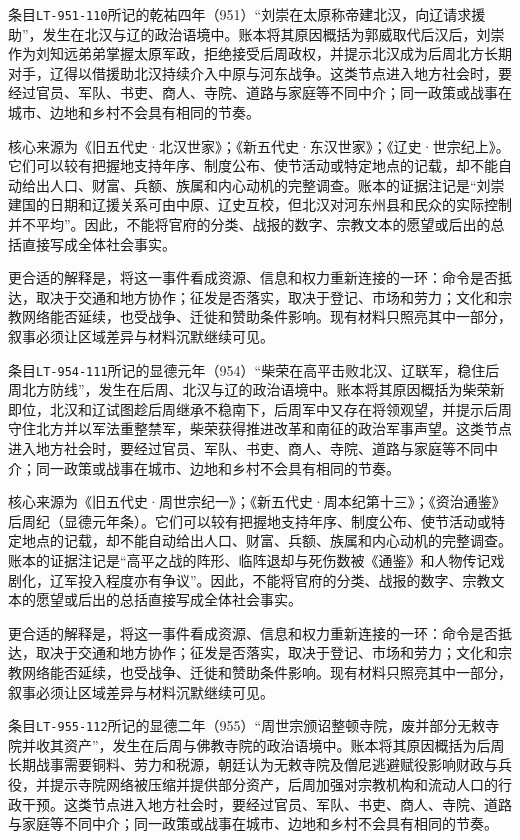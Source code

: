 条目\texttt{LT-951-110}所记的乾祐四年（951）“刘崇在太原称帝建北汉，向辽请求援助”，发生在北汉与辽的政治语境中。账本将其原因概括为郭威取代后汉后，刘崇作为刘知远弟弟掌握太原军政，拒绝接受后周政权，并提示北汉成为后周北方长期对手，辽得以借援助北汉持续介入中原与河东战争。这类节点进入地方社会时，要经过官员、军队、书吏、商人、寺院、道路与家庭等不同中介；同一政策或战事在城市、边地和乡村不会具有相同的节奏。

核心来源为《旧五代史·北汉世家》；《新五代史·东汉世家》；《辽史·世宗纪上》。它们可以较有把握地支持年序、制度公布、使节活动或特定地点的记载，却不能自动给出人口、财富、兵额、族属和内心动机的完整调查。账本的证据注记是“刘崇建国的日期和辽援关系可由中原、辽史互校，但北汉对河东州县和民众的实际控制并不平均”。因此，不能将官府的分类、战报的数字、宗教文本的愿望或后出的总括直接写成全体社会事实。

更合适的解释是，将这一事件看成资源、信息和权力重新连接的一环：命令是否抵达，取决于交通和地方协作；征发是否落实，取决于登记、市场和劳力；文化和宗教网络能否延续，也受战争、迁徙和赞助条件影响。现有材料只照亮其中一部分，叙事必须让区域差异与材料沉默继续可见。

条目\texttt{LT-954-111}所记的显德元年（954）“柴荣在高平击败北汉、辽联军，稳住后周北方防线”，发生在后周、北汉与辽的政治语境中。账本将其原因概括为柴荣新即位，北汉和辽试图趁后周继承不稳南下，后周军中又存在将领观望，并提示后周守住北方并以军法重整禁军，柴荣获得推进改革和南征的政治军事声望。这类节点进入地方社会时，要经过官员、军队、书吏、商人、寺院、道路与家庭等不同中介；同一政策或战事在城市、边地和乡村不会具有相同的节奏。

核心来源为《旧五代史·周世宗纪一》；《新五代史·周本纪第十三》；《资治通鉴》后周纪（显德元年条）。它们可以较有把握地支持年序、制度公布、使节活动或特定地点的记载，却不能自动给出人口、财富、兵额、族属和内心动机的完整调查。账本的证据注记是“高平之战的阵形、临阵退却与死伤数被《通鉴》和人物传记戏剧化，辽军投入程度亦有争议”。因此，不能将官府的分类、战报的数字、宗教文本的愿望或后出的总括直接写成全体社会事实。

更合适的解释是，将这一事件看成资源、信息和权力重新连接的一环：命令是否抵达，取决于交通和地方协作；征发是否落实，取决于登记、市场和劳力；文化和宗教网络能否延续，也受战争、迁徙和赞助条件影响。现有材料只照亮其中一部分，叙事必须让区域差异与材料沉默继续可见。

条目\texttt{LT-955-112}所记的显德二年（955）“周世宗颁诏整顿寺院，废并部分无敕寺院并收其资产”，发生在后周与佛教寺院的政治语境中。账本将其原因概括为后周长期战事需要铜料、劳力和税源，朝廷认为无敕寺院及僧尼逃避赋役影响财政与兵役，并提示寺院网络被压缩并提供部分资产，后周加强对宗教机构和流动人口的行政干预。这类节点进入地方社会时，要经过官员、军队、书吏、商人、寺院、道路与家庭等不同中介；同一政策或战事在城市、边地和乡村不会具有相同的节奏。


